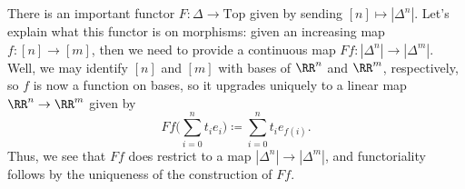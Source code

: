 \documentclass[../notes.tex]{subfiles}
\begin{document}
\begin{remark} \label{rem:}
	There is an important functor $F\colon\Delta\to\mathrm{Top}$ given by sending $[n]\mapsto\left|\Delta^n\right|$. Let's explain what this functor is on morphisms: given an increasing map $f\colon[n]\to[m]$, then we need to provide a continuous map $Ff\colon\left|\Delta^n\right|\to\left|\Delta^m\right|$. Well, we may identify $[n]$ and $[m]$ with bases of $\RR^n$ and $\RR^m$, respectively, so $f$ is now a function on bases, so it upgrades uniquely to a linear map $\RR^n\to\RR^m$ given by
	\[Ff\Bigg(\sum_{i=0}^nt_ie_i\Bigg)\coloneqq\sum_{i=0}^nt_ie_{f(i)}.\]
	Thus, we see that $Ff$ does restrict to a map $\left|\Delta^n\right|\to\left|\Delta^m\right|$, and functoriality follows by the uniqueness of the construction of $Ff$.
\end{remark}
\end{document}
